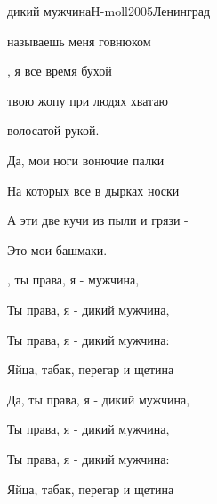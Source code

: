 \begin{song}{дикий мужчина}{H-moll}{2005}{Ленинград}{}{}

  \begin{SBVerse}
     называешь меня говнюком

    , я все время бухой

     твою жопу при людях хватаю

     волосатой рукой.
  \end{SBVerse}

  \begin{SBVerse}
    Да, мои ноги вонючие палки

    На которых все в дырках носки

    А эти две кучи из пыли и грязи -

    Это мои башмаки.
  \end{SBVerse}

  \begin{SBChorus}
    , ты права, я -  мужчина,

    Ты права, я - дикий мужчина,

    Ты права, я - дикий мужчина:

    Яйца, табак, перегар и щетина
  \end{SBChorus}

  \begin{SBChorus}
    Да, ты права, я - дикий мужчина,

    Ты права, я - дикий мужчина,

    Ты права, я - дикий мужчина:

    Яйца, табак, перегар и щетина
  \end{SBChorus}
\end{song}
